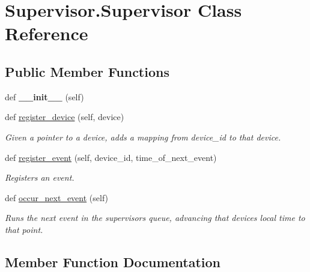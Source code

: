 \hypertarget{class_supervisor_1_1_supervisor}{}\section{Supervisor.\+Supervisor Class Reference}
\label{class_supervisor_1_1_supervisor}
\subsection*{Public Member Functions}
\begin{DoxyCompactItemize}
\item 
\mbox{\label{class_supervisor_1_1_supervisor_ae3c45d95cb0658b1a792d447084f0835}} 
def {\bfseries \+\_\+\+\_\+init\+\_\+\+\_\+} (self)
\item 
def \hyperlink{class_supervisor_1_1_supervisor_abcfeed6e2cf6aec51fd85133dcc7668d}{register\+\_\+device} (self, device)
\begin{DoxyCompactList}\small\item\em Given a pointer to a device, adds a mapping from device\+\_\+id to that device. \end{DoxyCompactList}\item 
def \hyperlink{class_supervisor_1_1_supervisor_aa2199e82392a38e22e391e03885fb4c2}{register\+\_\+event} (self, device\+\_\+id, time\+\_\+of\+\_\+next\+\_\+event)
\begin{DoxyCompactList}\small\item\em Registers an event. \end{DoxyCompactList}\item 
\mbox{\label{class_supervisor_1_1_supervisor_a93a80c2aa032144e4bdc3fb1183335c8}} 
def \hyperlink{class_supervisor_1_1_supervisor_a93a80c2aa032144e4bdc3fb1183335c8}{occur\+\_\+next\+\_\+event} (self)
\begin{DoxyCompactList}\small\item\em Runs the next event in the supervisor\textquotesingle{}s queue, advancing that device\textquotesingle{}s local time to that point. \end{DoxyCompactList}\end{DoxyCompactItemize}


\subsection{Member Function Documentation}
\mbox{\label{class_supervisor_1_1_supervisor_abcfeed6e2cf6aec51fd85133dcc7668d}} 

